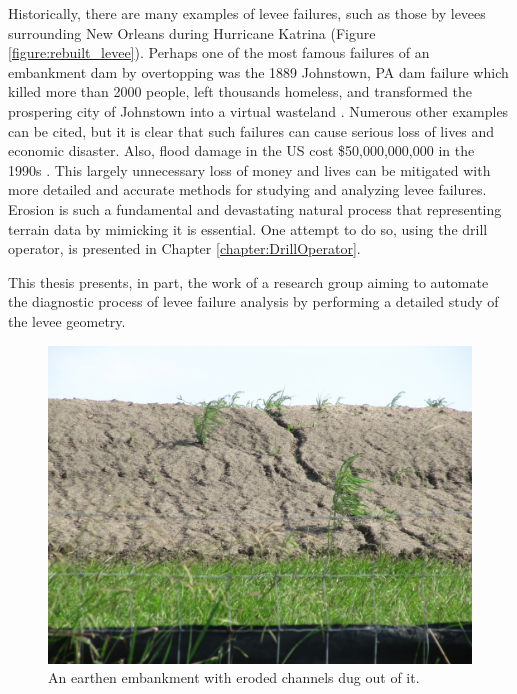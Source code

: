 Historically, there are many examples of levee failures, such as those by levees surrounding New Orleans during Hurricane Katrina (Figure \ref{figure:rebuilt_levee}).  Perhaps one of the most famous failures of an embankment dam by overtopping was the 1889 Johnstown, PA dam failure which killed more than 2000 people, left thousands homeless, and transformed the prospering city of Johnstown into a virtual wasteland \cite{Schnitter}.  Numerous other examples can be cited, but it is clear that such failures can cause serious loss of lives and economic disaster. Also, flood damage in the US cost \$50,000,000,000 in the 1990s \cite{FloodDamageData}. 
This largely unnecessary loss of money and lives can be mitigated with more detailed and accurate methods for studying and analyzing levee failures.
Erosion is such a fundamental and devastating natural process that representing terrain data by mimicking it is essential. One attempt to do so, using the drill operator, is presented in Chapter \ref{chapter:DrillOperator}.


This thesis presents, in part, the work of a research group aiming to automate the diagnostic process of levee failure analysis by performing a detailed study of the levee geometry.


\begin{figure}[t]
  \centering
  \begin{minipage}{0.99\textwidth}
    \includegraphics[width=1.0\textwidth]{images/RillsAndGullies.jpg}
  \end{minipage}
  \caption[Eroded channels on an earthen embankment]{An earthen embankment with eroded channels dug out of it.}
  \label{figure:rills_and_gullies}	
\end{figure}



